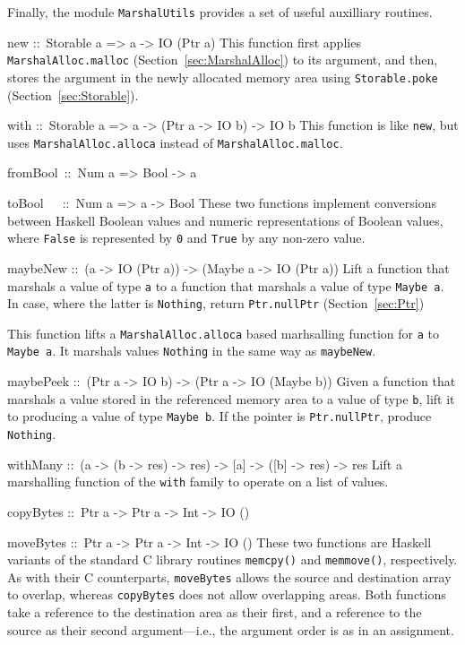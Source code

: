 \documentclass[a4paper,twosides]{article}
\makeatletter
\newcommand{\code}[1]{\texttt{#1}}      %
\newenvironment{codedesc}{%
  \list{}{\labelwidth\z@
    \let\makelabel\codedesclabel}
  }{%
  \endlist
  }
\newcommand*{\codedesclabel}[1]{%
  \hspace{-\leftmargin}
  \parbox[b]{\labelwidth}{\makebox[0pt][l]{\code{#1}}\\}\hfil\relax
  }
\newcommand{\combineitems}{\vspace*{-\itemsep}\vspace*{-\parsep}\vspace*{-1em}}
\makeatother
\begin{document}
Finally, the module \code{MarshalUtils} provides a set of useful auxilliary
routines. 
%
\begin{codedesc}
\item[new ::\ Storable a => a -> IO (Ptr a)] This function first applies
  \code{MarshalAlloc.malloc} (Section~\ref{sec:MarshalAlloc}) to its
  argument, and then, stores the argument in the newly allocated memory area
  using \code{Storable.poke} (Section~\ref{sec:Storable}).
  
\item[with ::\ Storable a => a -> (Ptr a -> IO b) -> IO b] This function is
  like \code{new}, but uses \code{MarshalAlloc.alloca} instead of
  \code{MarshalAlloc.malloc}.

\item[fromBool~::\ Num a => Bool -> a]
\item[toBool~~~::\ Num a => a -> Bool]\combineitems These two functions
  implement conversions between Haskell Boolean values and numeric
  representations of Boolean values, where \code{False} is represented by
  \code{0} and \code{True} by any non-zero value.

\item[maybeNew ::\ (a -> IO (Ptr a)) -> (Maybe a -> IO (Ptr a))]
  Lift a function that marshals a value of type \code{a} to a function that
  marshals a value of type \code{Maybe a}.  In case, where the latter is
  \code{Nothing}, return \code{Ptr.nullPtr} (Section~\ref{sec:Ptr})

\item[maybeWith ::\ (a -> (Ptr b -> IO c) -> IO c)%
  -> (Maybe a -> (Ptr b -> IO c) -> IO c)] This function lifts a
  \code{MarshalAlloc.alloca} based marhsalling function for \code{a} to
  \code{Maybe a}.  It marshals values \code{Nothing} in the same way as
  \code{maybeNew}. 
  
\item[maybePeek ::\ (Ptr a -> IO b) -> (Ptr a -> IO (Maybe b))] Given a
  function that marshals a value stored in the referenced memory area to a
  value of type \code{b}, lift it to producing a value of type \code{Maybe b}.
  If the pointer is \code{Ptr.nullPtr}, produce \code{Nothing}.
  
\item[withMany ::\ (a -> (b -> res) -> res) -> {[a]} -> ({[b]} -> res) -> res]
  Lift a marshalling function of the \code{with} family to operate on a list
  of values.

\item[copyBytes ::\ Ptr a -> Ptr a -> Int -> IO ()]
\item[moveBytes ::\ Ptr a -> Ptr a -> Int -> IO ()]\combineitems These two
  functions are Haskell variants of the standard C library routines
  \code{memcpy()} and \code{memmove()}, respectively.  As with their C
  counterparts, \code{moveBytes} allows the source and destination array to
  overlap, whereas \code{copyBytes} does not allow overlapping areas.  Both
  functions take a reference to the destination area as their first, and a
  reference to the source as their second argument---i.e., the argument order
  is as in an assignment.
\end{codedesc}
\end{document}
